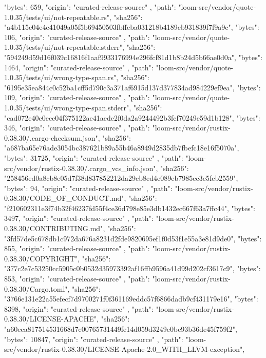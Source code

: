{{      "bytes": 659,
      "origin": "curated-release-source"
    },
    {
      "path": "loom-src/vendor/quote-1.0.35/tests/ui/not-repeatable.rs",
      "sha256": "a4b115c04e4e41049a05f5b69450503fbffeba031218b4189cb931839f7f9a9c",
      "bytes": 106,
      "origin": "curated-release-source"
    },
    {
      "path": "loom-src/vendor/quote-1.0.35/tests/ui/not-repeatable.stderr",
      "sha256": "594249d59d16f039c16816f1aaf9933176994e296fcf81d1b8b24d5b66ae0d0a",
      "bytes": 1464,
      "origin": "curated-release-source"
    },
    {
      "path": "loom-src/vendor/quote-1.0.35/tests/ui/wrong-type-span.rs",
      "sha256": "6195e35ea844c0c52ba1cff5d790c3a371af6915d137d377834ad984229ef9ea",
      "bytes": 109,
      "origin": "curated-release-source"
    },
    {
      "path": "loom-src/vendor/quote-1.0.35/tests/ui/wrong-type-span.stderr",
      "sha256": "cad072e40e0ecc04f375122ae41aede2f0da2a9244492b3fcf70249e59d1b128",
      "bytes": 346,
      "origin": "curated-release-source"
    },
    {
      "path": "loom-src/vendor/rustix-0.38.30/.cargo-checksum.json",
      "sha256": "a687ba65e76ade3054bc387621b89a55b46a8949d2835db7fbefc18e16f5070a",
      "bytes": 31725,
      "origin": "curated-release-source"
    },
    {
      "path": "loom-src/vendor/rustix-0.38.30/.cargo_vcs_info.json",
      "sha256": "258456ed0a8cb8e05d7f38d837852212da29cb8ed4e089eb7985ec3e5feb2559",
      "bytes": 94,
      "origin": "curated-release-source"
    },
    {
      "path": "loom-src/vendor/rustix-0.38.30/CODE_OF_CONDUCT.md",
      "sha256": "f210602311e3f74b32f46237fd55f4ce36d798e85e3db1432ec667f63a7ffc44",
      "bytes": 3497,
      "origin": "curated-release-source"
    },
    {
      "path": "loom-src/vendor/rustix-0.38.30/CONTRIBUTING.md",
      "sha256": "3fd57de5c678db1c972da676a8231d2fde9820695ef1f0d53f1e55a3e81d9de0",
      "bytes": 855,
      "origin": "curated-release-source"
    },
    {
      "path": "loom-src/vendor/rustix-0.38.30/COPYRIGHT",
      "sha256": "377c2e7c53250cc5905c0b0532d35973392af16ffb9596a41d99d202cf3617c9",
      "bytes": 853,
      "origin": "curated-release-source"
    },
    {
      "path": "loom-src/vendor/rustix-0.38.30/Cargo.toml",
      "sha256": "3766e131e22a55efecf7d9700271f0f361169eddc57f6866dadb9cf431179e16",
      "bytes": 8398,
      "origin": "curated-release-source"
    },
    {
      "path": "loom-src/vendor/rustix-0.38.30/LICENSE-APACHE",
      "sha256": "a60eea817514531668d7e00765731449fe14d059d3249e0bc93b36de45f759f2",
      "bytes": 10847,
      "origin": "curated-release-source"
    },
    {
      "path": "loom-src/vendor/rustix-0.38.30/LICENSE-Apache-2.0_WITH_LLVM-exception",
}}
